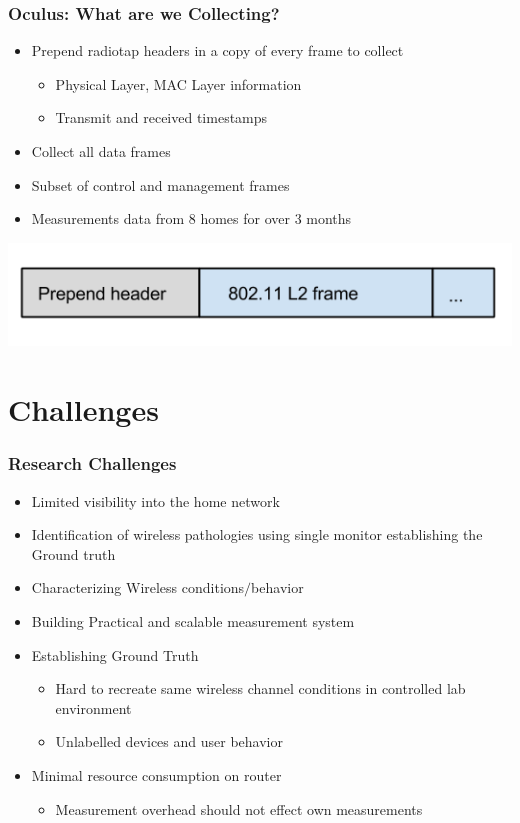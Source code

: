 \documentclass{beamer}
\begin{document}
\begin{frame}
  \frametitle{Oculus: What are we Collecting?} 
  \begin{itemize} 
    \item Prepend radiotap headers in a copy of every frame to collect
    \begin{itemize}
       \item Physical Layer, MAC Layer information
       \item Transmit and received timestamps
    \end{itemize}
  \item Collect all data frames
  \item Subset of control and management frames
  \item Measurements data from 8 homes for over 3 months
  \end{itemize}
  \centering
  \includegraphics[width=.8\textwidth]{./images/jig_header.png}
\end{frame}

\section{Challenges}
\begin{frame}
  \frametitle{Research Challenges}
    \begin{itemize}
    \item Limited visibility into the home network
    \item Identification of wireless pathologies using single monitor
      establishing the Ground truth 
    \item Characterizing Wireless conditions$/$behavior
    \item Building Practical and scalable measurement system
      \item Establishing Ground Truth
      \begin{itemize}
        \item Hard to recreate same wireless channel conditions in controlled lab environment
        \item Unlabelled devices and user behavior
      \end{itemize}
    \item Minimal resource consumption on router
      \begin{itemize}
        \item Measurement overhead should not effect own measurements
      \end{itemize}
    \end{itemize}
\end{frame}
\end{document}
